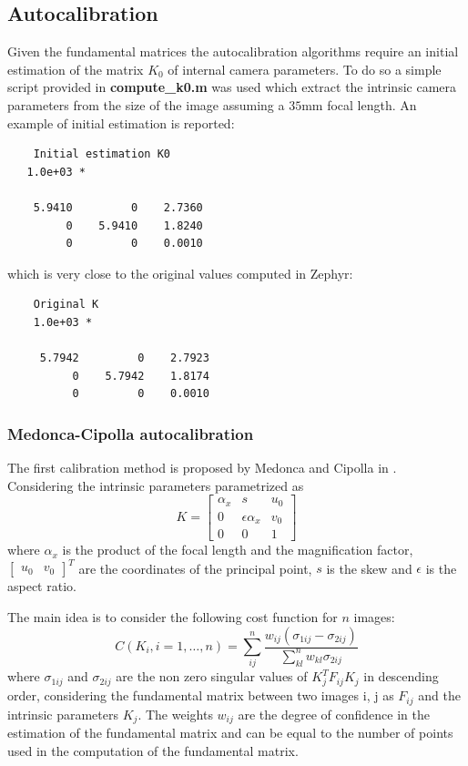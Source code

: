 \documentclass[12pt]{article}
\begin{document}
\subsection{Autocalibration}
Given the fundamental matrices the autocalibration algorithms require an initial estimation of the matrix $K_0$ of internal camera parameters. To do so a simple script provided in \textbf{compute\_k0.m} was used which extract the intrinsic camera parameters from the size of the image assuming a $35$mm focal length. An example of initial estimation is reported:
\begin{verbatim}
    Initial estimation K0
   1.0e+03 *

    5.9410         0    2.7360
         0    5.9410    1.8240
         0         0    0.0010
\end{verbatim}
which is very close to the original values computed in Zephyr:
\begin{verbatim}
    Original K
    1.0e+03 *
 
     5.7942         0    2.7923
          0    5.7942    1.8174
          0         0    0.0010
\end{verbatim}
\subsubsection{Medonca-Cipolla autocalibration}
The first calibration method is proposed by Medonca and Cipolla in \cite{Medonca99}. Considering the intrinsic parameters parametrized as
\begin{equation}
    K = \begin{bmatrix}
        \alpha_x & s & u_0 \\
        0   & \epsilon\alpha_x & v_0 \\
        0 & 0 & 1
    \end{bmatrix}
\end{equation}
where $\alpha_x$ is the product of the focal length and the magnification factor, $\begin{bmatrix}
    u_0 & v_0
\end{bmatrix}^T$ are the coordinates of the principal point, $s$ is the skew and $\epsilon$ is the aspect ratio.

The main idea is to consider the following cost function for $n$ images:
\begin{equation}
    C(K_i, i = 1,\dots, n) = \sum_{ij}^{n} \frac{w_{ij} (\sigma_{1ij}-\sigma_{2ij})}{\sum_{kl}^{n}w_{kl} \sigma_{2ij}}
\end{equation}
where $\sigma_{1ij}$ and $\sigma_{2ij}$ are the non zero singular values of $K_j^TF_{ij}K_j$ in descending order, considering the fundamental matrix between two images i, j as $F_{ij}$ and the intrinsic parameters $K_j$. The weights $w_{ij}$ are the degree of confidence in the estimation of the fundamental matrix and can be equal to the number of points used in the computation of the fundamental matrix.
\end{document}
